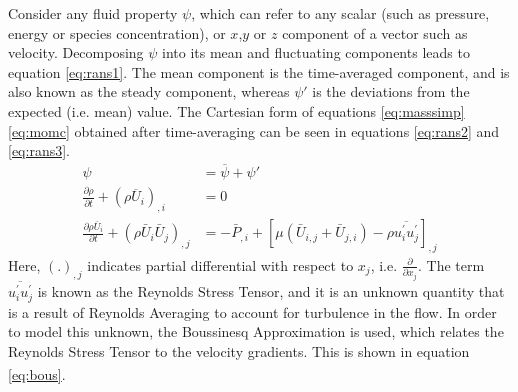 \documentclass[11pt,a4paper,twoside,oneside]{article}
\begin{document}
Consider any fluid property $\psi$, which can refer to any scalar (such as pressure, energy or species concentration), or $x$,$y$ or $z$ component of a vector such as velocity. Decomposing $\psi$ into its mean and fluctuating components leads to equation \ref{eq:rans1}. The mean component is the time-averaged component, and is also known as the steady component, whereas $\psi'$ is the deviations from the expected (i.e. mean) value. The Cartesian form of equations \ref{eq:masssimp} \ref{eq:momc} obtained after time-averaging can be seen in equations \ref{eq:rans2} and \ref{eq:rans3}. %
\begin{align}
    \label{eq:rans1}
    \psi&=\overline{\psi}+\psi'\\
   \label{eq:rans2}\frac{\partial \rho}{\partial t}+\left(\rho \overline{U}_{i}\right)_{, i}&=0 \\
    \label{eq:rans3}
    \frac{\partial \rho \bar{U}_{i}}{\partial t}+\left(\rho \bar{U}_{i} \bar{U}_{j}\right)_{, j}&=-\bar{P}_{, i}+\left[\mu\left(\bar{U}_{i, j}+\bar{U}_{j, i}\right)-\rho \overline{u_{i}^{\prime} u_{j}^{\prime}}\right]_{, j}
\end{align}
Here, $(.)_{,j}$ indicates partial differential with respect to $x_j$, i.e. $\frac{\partial}{\partial x_j}$. The term $\overline{u_{i}^{\prime} u_{j}^{\prime}}$ is known as the Reynolds Stress Tensor, and it is an unknown quantity that is a result of Reynolds Averaging to account for turbulence in the flow. In order to model this unknown, the Boussinesq Approximation is used\cite{boussinesq}, which relates the Reynolds Stress Tensor to the velocity gradients. This is shown in equation \ref{eq:bous}\textsuperscript{\cite{turbmodelintro}}.
\end{document}
